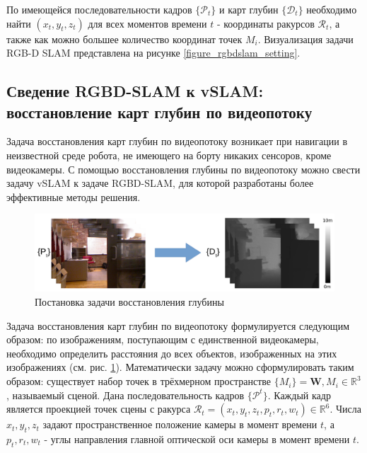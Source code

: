 \documentclass{mipt-thesis-ms}
\begin{document}
	По имеющейся последовательности кадров $\{\mathcal{P}_t\}$ и карт глубин $\{\mathcal{D}_t\}$ необходимо найти $(x_t, y_t, z_t)$ для всех моментов времени $t$ - координаты ракурсов $\mathcal{R}_t$, а также как можно большее количество координат точек $M_i$. Визуализация задачи RGB-D SLAM представлена на рисунке \ref{figure_rgbdslam_setting}.
	
	\subsection{Сведение RGBD-SLAM к vSLAM: восстановление карт глубин по видеопотоку}
	
	Задача восстановления карт глубин по видеопотоку возникает при навигации в неизвестной среде робота, не имеющего на борту никаких сенсоров, кроме видеокамеры. С помощью восстановления глубины по видеопотоку можно свести задачу vSLAM к задаче RGBD-SLAM, для которой разработаны более эффективные методы решения.
	
	\begin{figure}
		\centering
		\includegraphics[width=1.0\textwidth]{img/de_problem_setting_1.png}
		\caption{Постановка задачи восстановления глубины}
		\label{figure_de_setting}
	\end{figure}
	
	Задача восстановления карт глубин по видеопотоку формулируется следующим образом: по изображениям, поступающим с единственной видеокамеры, необходимо определить расстояния до всех объектов, изображенных на этих изображениях (см. рис. \ref{figure_de_setting}). Математически задачу можно сформулировать таким образом: существует набор точек в трёхмерном пространстве $\{M_i \} = \textbf{W}, M_i \in \mathbb{R}^3$, называемый сценой. Дана последовательность кадров $\{\mathcal{P}^t\}$. Каждый кадр является проекцией точек сцены с ракурса $\mathcal{R}_t = (x_t, y_t, z_t, p_t, r_t, w_t) \in \mathbb{R}^6$. Числа $x_t, y_t, z_t$ задают пространственное положение камеры в момент времени $t$, а $p_t, r_t, w_t$ - углы направления главной оптической оси камеры в момент времени $t$.
	
\end{document}
